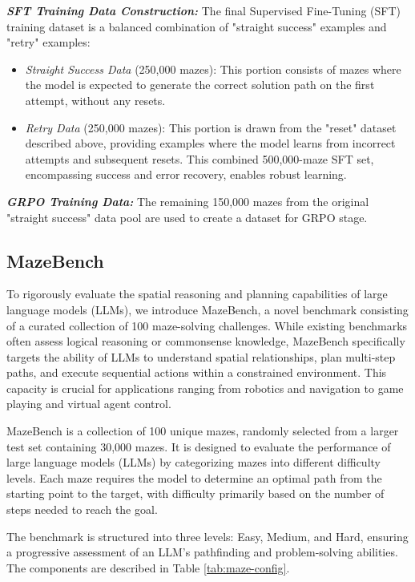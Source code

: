  \textit{\textbf{SFT Training Data Construction:}} The final Supervised Fine-Tuning (SFT) training dataset is a balanced combination of "straight success" examples and "retry" examples:
\begin{itemize}
    \item \textit{Straight Success Data} (250,000 mazes):  This portion consists of mazes where the model is expected to generate the correct solution path on the first attempt, without any resets.
    \item \textit{Retry Data} (250,000 mazes): This portion is drawn from the "reset" dataset described above, providing examples where the model learns from incorrect attempts and subsequent resets. This combined 500,000-maze SFT set, encompassing success and error recovery, enables robust learning.
\end{itemize}
 \textit{\textbf{GRPO Training Data:} } The remaining 150,000 mazes from the original "straight success" data pool are used to create a dataset for GRPO stage. 



\subsection{MazeBench}

To rigorously evaluate the spatial reasoning and planning capabilities of large language models (LLMs), we introduce MazeBench, a novel benchmark consisting of a curated collection of 100 maze-solving challenges. While existing benchmarks often assess logical reasoning or commonsense knowledge, MazeBench specifically targets the ability of LLMs to understand spatial relationships, plan multi-step paths, and execute sequential actions within a constrained environment. This capacity is crucial for applications ranging from robotics and navigation to game playing and virtual agent control.



MazeBench is a collection of 100 unique mazes, randomly selected from a larger test set containing 30,000 mazes. It is designed to evaluate the performance of large language models (LLMs) by categorizing mazes into different difficulty levels. Each maze requires the model to determine an optimal path from the starting point to the target, with difficulty primarily based on the number of steps needed to reach the goal.

The benchmark is structured into three levels: Easy, Medium, and Hard, ensuring a progressive assessment of an LLM’s pathfinding and problem-solving abilities. The components are described in Table \ref{tab:maze-config}.

